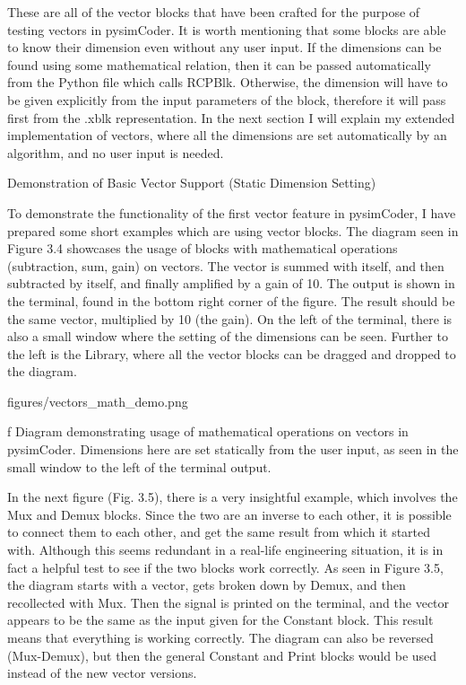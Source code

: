 \quad These are all of the vector blocks that have been crafted for the purpose of testing vectors in
pysimCoder. It is worth mentioning that some blocks are able to know their dimension even without any user
input. If the dimensions can be found using some mathematical relation, then it can be passed automatically
from the Python file which calls RCPBlk. Otherwise, the dimension will have to be given explicitly from the
input parameters of the block, therefore it will pass first from the .xblk representation. In the next section
I will explain my extended implementation of vectors, where all the dimensions are set automatically by an
algorithm, and no user input is needed.

\secc Demonstration of Basic Vector Support (Static Dimension Setting)

\qquad To demonstrate the functionality of the first vector feature in pysimCoder, I have prepared some
short examples which are using vector blocks. The diagram seen in Figure 3.4 showcases the usage of blocks
with mathematical operations (subtraction, sum, gain) on vectors. The vector is summed with itself,
and then subtracted by itself, and finally amplified by a gain of 10. The output is shown in the terminal,
found in the bottom right corner of the figure. The result should be the same vector, multiplied
by 10 (the gain). On the left of the terminal, there is also a small window where the setting of the
dimensions can be seen. Further to the left is the Library, where all the vector blocks can be
dragged and dropped to the diagram.

\midinsert {}
\picw=14cm \cinspic figures/vectors_math_demo.png
\caption/f Diagram demonstrating usage of mathematical operations on vectors in pysimCoder. Dimensions here
are set statically from the user input, as seen in the small window to the left of the terminal output.
\endinsert

\quad In the next figure (Fig. 3.5), there is a very insightful example, which involves the Mux and Demux blocks.
Since the two are an inverse to each other, it is possible to connect them to each other, and get the same
result from which it started with. Although this seems redundant in a real-life engineering situation, it is
in fact a helpful test to see if the two blocks work correctly. As seen in Figure 3.5, the diagram
starts with a vector, gets broken down by Demux, and then recollected with Mux. Then the signal is printed
on the terminal, and the vector appears to be the same as the input given for the Constant block. This result
means that everything is working correctly. The diagram can also be reversed (Mux-Demux), but then the
general Constant and Print blocks would be used instead of the new vector versions.

